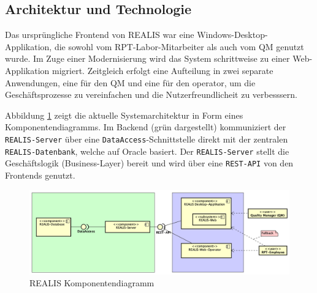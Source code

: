 \subsection{Architektur und Technologie}
Das ursprüngliche Frontend von REALIS war eine Windows-Desktop-Applikation, die sowohl vom \gls{RPT}-Labor-Mitarbeiter als auch vom \gls{QM} genutzt wurde. Im Zuge einer Modernisierung wird das System schrittweise zu einer Web-Applikation migriert. Zeitgleich erfolgt eine Aufteilung in zwei separate Anwendungen, eine für den \gls{QM} und eine für den \gls{operator}, um die Geschäftsprozesse zu vereinfachen und die Nutzerfreundlicheit zu verbesssern.

Abbildung \ref{fig:realis-komponentendiagramm} zeigt die aktuelle Systemarchitektur in Form eines Komponentendiagramms. Im Backend (grün dargestellt) kommuniziert der \texttt{REALIS-Server} über eine \texttt{DataAccess}-Schnittstelle direkt mit der zentralen \texttt{REALIS-Datenbank}, welche auf Oracle basiert. Der \texttt{REALIS-Server} stellt die Geschäftslogik (Business-Layer) bereit und wird über eine \texttt{REST-API} von den Frontends genutzt.

\begin{figure}[!h]
    \centering
    \includegraphics[width=1\textwidth]{bilder/REALIS-Komponentendiagramm.png}
    \caption{REALIS Komponentendiagramm}
    \label{fig:realis-komponentendiagramm}
\end{figure}

